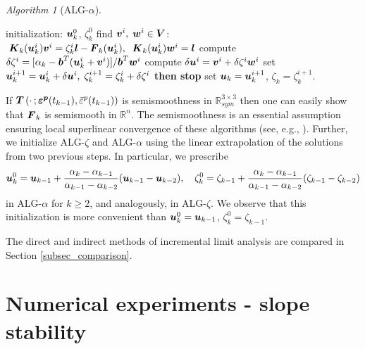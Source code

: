 \documentclass[a4paper,12pt]{article}
\theoremstyle{remark}
\newtheorem{algorithm}{Algorithm}
\newcommand{\mbf}[1]{\mbox{\boldmath$#1$}}
\numberwithin{equation}{section}
\begin{document}
\begin{algorithm}[ALG-$\alpha$]
\hspace{0.2cm}
\begin{spacing}{1.2}
\begin{algorithmic}[1]
  \STATE initialization: $\mbf{u}_{k}^0$, $\zeta_k^0$
    \STATE find $\mbf{v}^{i},\;\mbf{w}^{i}\in\mbf{V}$: $\;\mbf {K}_k(\mbf{u}_{k}^i)\mbf{v}^{i}=\zeta_k^i\mbf{l}-\mbf{F}_{k}(\mbf{u}_{k}^i),\;\;\mbf {K}_k(\mbf{u}_{k}^i)\mbf{w}^{i}=\mbf{l}$
    \STATE compute $\delta\zeta^i=[\alpha_k-\mbf b^T(\mbf{u}_{k}^i+\mbf{v}^{i})]/\mbf b^T\mbf{w}^{i}$
    \STATE compute $\delta \mbf{u}^{i}=\mbf{v}^{i}+\delta\zeta^i\mbf{w}^{i}$
    \STATE set $\mbf{u}_{k}^{i+1}=\mbf{u}_{k}^i+\delta \mbf{u}^{i},\; \zeta_{k}^{i+1}=\zeta_{k}^i+\delta \zeta^{i}$
    \STATE {\bf if
    }{$\|\delta
    \mbf{u}^{i}\|/(\|\mbf{u}_{k}^{i+1}\|+\|\mbf{u}_{k}^i\|)\leq\epsilon_{Newton}$} {\bf then stop}
  \ENDFOR
  \STATE set $\mbf{u}_{k}=\mbf{u}_{k}^{i+1}$, $\zeta_k=\zeta_k^{i+1}$.
\end{algorithmic}
\end{spacing}
\end{algorithm}
If $\mbf T\left(\cdot\,;\mbf{\varepsilon^p}(t_{k-1}),\bar{\varepsilon}^p(t_{k-1})\right)$  is semismoothness in $\mathbb R^{3\times 3}_{sym}$ then one can easily show that $\mbf F_k$ is semismooth in $\mathbb R^n$. The semismoothness is an essential assumption ensuring local superlinear convergence of these algorithms (see, e.g., \cite{CHKS15}). Further, we initialize ALG-$\zeta$ and ALG-$\alpha$ using the linear extrapolation of the solutions from two previous steps. In particular, we prescribe
$$\mbf{u}_{k}^0=\mbf u_{k-1}+\frac{\alpha_k-\alpha_{k-1}}{\alpha_{k-1}-\alpha_{k-2}}(\mbf u_{k-1}-\mbf u_{k-2}),\quad \zeta_{k}^0=\zeta_{k-1}+\frac{\alpha_k-\alpha_{k-1}}{\alpha_{k-1}-\alpha_{k-2}}(\zeta_{k-1}-\zeta_{k-2})$$
in ALG-$\alpha$  for $k\geq 2$, and analogously, in ALG-$\zeta$. We observe that this initialization is more convenient than $\mbf{u}_{k}^0=\mbf u_{k-1}$, $\zeta_k^0=\zeta_{k-1}$.

The direct and indirect methods of incremental limit analysis are compared in Section \ref{subsec_comparison}.



\section{Numerical experiments - slope stability}
\label{sec_experiments}
\end{document}
